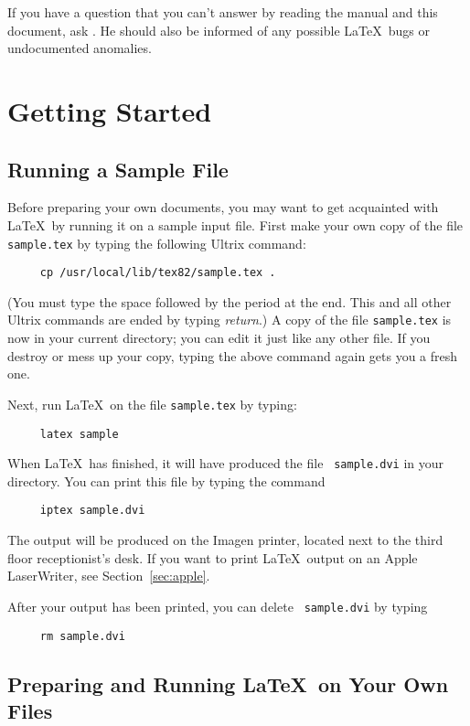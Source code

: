 If you have a question that you can't answer by reading the manual and
this document, ask \contact.  He should also be informed of any
possible \LaTeX\ bugs or undocumented anomalies.
 
 
\section{Getting Started}
 
\subsection{Running a Sample File} \label{sec:sample}
 
Before preparing your own documents, you may want to get acquainted
with \LaTeX\ by running it on a sample input file.  First make your own
copy of the file \mbox{\tt sample.tex} by typing the following
Ultrix command:
\begin{verbatim}
     cp /usr/local/lib/tex82/sample.tex .
\end{verbatim}
(You must type the space followed by the period at the end.  This
and all other Ultrix commands are ended by typing {\em return}.)
A copy of the file \mbox{\tt sample.tex} is now in your current
directory; you can edit it just like any other file.  If you destroy or
mess up your copy, typing the above command again gets you a fresh
one.
 
Next, run \LaTeX\ on the file \mbox{\tt sample.tex} by typing:
\begin{verbatim}
     latex sample
\end{verbatim}
When \LaTeX\ has finished, it will have produced the file \mbox{\tt
sample.dvi} in your directory.  You can print this file by typing the
command
\begin{verbatim}
     iptex sample.dvi
\end{verbatim}
The output will be produced on the Imagen printer, located next to the
third floor receptionist's desk.  If you want to print \LaTeX\ output
on an Apple LaserWriter, see Section~\ref{sec:apple}.
 
After your output has been printed, you can delete \mbox{\tt
sample.dvi} by typing
\begin{verbatim}
     rm sample.dvi
\end{verbatim}
 
\subsection{Preparing and Running \LaTeX\ on Your Own Files}
 
